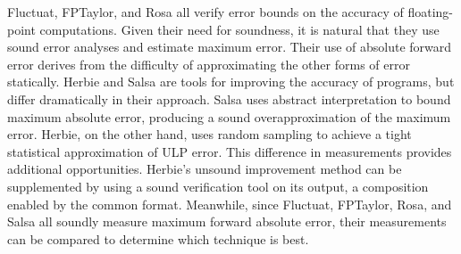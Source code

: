\documentclass[main.tex]{subfiles}
\begin{document}
Fluctuat, FPTaylor, and Rosa all verify error bounds
  on the accuracy of floating-point computations.
Given their need for soundness, it is natural
  that they use sound error analyses and estimate maximum error.
Their use of absolute forward error derives from the difficulty
  of approximating the other forms of error statically.
Herbie and Salsa are tools for improving the accuracy of programs,
  but differ dramatically in their approach.
Salsa uses abstract interpretation to bound maximum absolute error,
  producing a sound overapproximation of the maximum error.
Herbie, on the other hand, uses random sampling to achieve
  a tight statistical approximation of ULP error.
This difference in measurements provides additional opportunities.
Herbie's unsound improvement method can be supplemented
  by using a sound verification tool on its output,
  a composition enabled by the common \core format.
Meanwhile, since Fluctuat, FPTaylor, Rosa, and Salsa
  all soundly measure maximum forward absolute error,
  their measurements can be compared to determine which technique is best.


 
\end{document}
